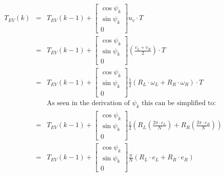 \documentclass[12pt]{article}
\begin{document}
	\begin{eqnarray}
	{T}_{EV}(k) &=& {T}_{EV}(k-1) + \left[
	\begin{array}{c}
	\cos \psi_k\\
	\sin \psi_k \\
	0
	\end{array}
	\right] u_v \cdot T \nonumber \\
	&=& {T}_{EV}(k-1) + \left[
	\begin{array}{c}
	\cos \psi_k\\
	\sin \psi_k \\
	0
	\end{array}
	\right] \left( \frac{v_L + v_R}{2} \right) \cdot T \nonumber \\
	&=& {T}_{EV}(k-1) + \left[
	\begin{array}{c}
	\cos \psi_k\\
	\sin \psi_k \\
	0
	\end{array}
	\right] \frac{1}{2}(R_L\cdot\omega_L + R_R\cdot\omega_R)\cdot T \nonumber \nonumber \\
	&& \text{As seen in the derivation of $\psi_k$ this can be simplified to:}	\nonumber \\
	&=& {T}_{EV}(k-1) + \left[
	\begin{array}{c}
	\cos \psi_k\\
	\sin \psi_k \\
	0
	\end{array}
	\right] \frac{1}{2}\left(R_L\left(\frac{2\pi \cdot e_L}{N}\right) + R_R\left(\frac{2\pi \cdot e_R}{N}\right)\right) \nonumber  \\
	&=& {T}_{EV}(k-1) + \left[
	\begin{array}{c}
	\cos \psi_k\\
	\sin \psi_k \\
	0
	\end{array}
	\right] \frac{\pi}{N}(R_L\cdot e_L + R_R\cdot e_R) \\
	\nonumber \end{eqnarray}
	 
\end{document}

